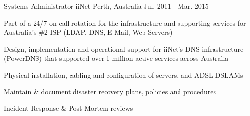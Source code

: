 \begin{cventries}
  \cventry
    {Systems Administrator} %
    {iiNet} %
    {Perth, Australia} %
    {Jul. 2011 - Mar. 2015} %
    {
      \begin{cvitems} %
        \item {Part of a 24/7 on call rotation for the infrastructure and supporting services for Australia's \#2 ISP (LDAP, DNS, E-Mail, Web Servers)}
        \item {Design, implementation and operational support for iiNet's DNS infrastructure (PowerDNS) that supported over 1 million active services across Australia}
        \item {Physical installation, cabling and configuration of servers, and ADSL DSLAMs}
        \item {Maintain \& document disaster recovery plans, policies and procedures}
        \item {Incident Response \& Post Mortem reviews}
      \end{cvitems}
    }
\end{cventries}
